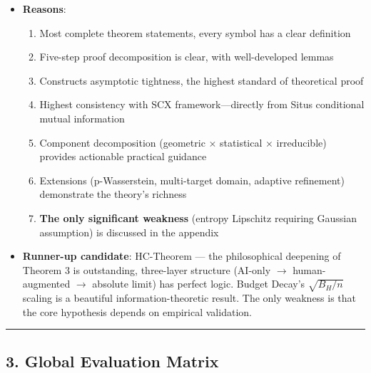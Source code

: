\documentclass[
  12pt,
]{article}
\providecommand{\tightlist}{%
  \setlength{\itemsep}{0pt}\setlength{\parskip}{0pt}}
\begin{document}
\begin{itemize}
\tightlist
\item
  \textbf{Reasons}:

  \begin{enumerate}
  \def\labelenumi{\arabic{enumi}.}
  \tightlist
  \item
    Most complete theorem statements, every symbol has a clear definition
  \item
    Five-step proof decomposition is clear, with well-developed lemmas
  \item
    Constructs asymptotic tightness, the highest standard of theoretical proof
  \item
    Highest consistency with SCX framework---directly from Situs conditional mutual information
  \item
    Component decomposition (geometric $\times$ statistical $\times$ irreducible) provides actionable practical guidance
  \item
    Extensions (p-Wasserstein, multi-target domain, adaptive refinement) demonstrate the theory's richness
  \item
    \textbf{The only significant weakness} (entropy Lipschitz requiring Gaussian assumption) is discussed in the appendix
  \end{enumerate}
\item
  \textbf{Runner-up candidate}: HC-Theorem --- the philosophical deepening of Theorem 3 is outstanding, three-layer structure (AI-only $\to$ human-augmented $\to$ absolute limit) has perfect logic. Budget Decay's $\sqrt{B_H/n}$ scaling is a beautiful information-theoretic result. The only weakness is that the core hypothesis depends on empirical validation.
\end{itemize}

\begin{center}\rule{0.5\linewidth}{0.5pt}\end{center}

\subsection{3. Global Evaluation Matrix}\label{global-evaluation-matrix}
\end{document}
